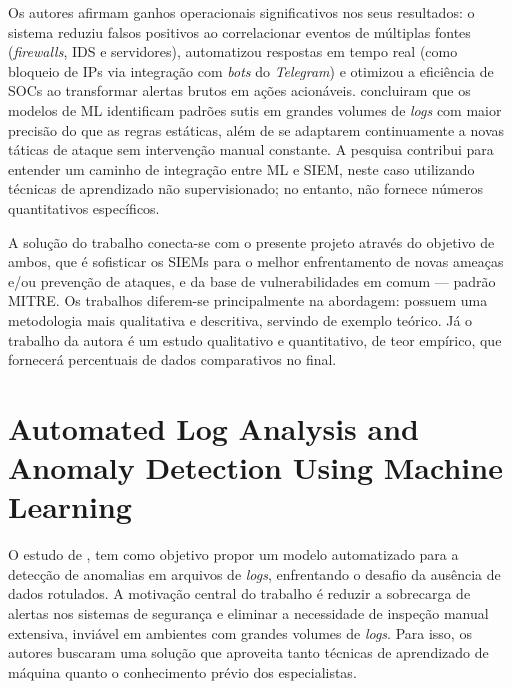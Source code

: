 Os autores afirmam ganhos operacionais significativos nos seus resultados: 
o sistema reduziu falsos positivos ao correlacionar eventos de múltiplas fontes (\textit{firewalls}, IDS e servidores), 
automatizou respostas em tempo real (como bloqueio de IPs via integração com \textit{bots} do \textit{Telegram}) e otimizou a eficiência de SOCs ao transformar alertas brutos em ações acionáveis. 
 concluiram que os modelos de ML identificam padrões sutis em grandes volumes de \textit{logs} com maior precisão do que as regras estáticas, além de se adaptarem continuamente a novas táticas de ataque sem intervenção manual constante.
A pesquisa contribui para entender um caminho de integração entre ML e SIEM, neste caso utilizando técnicas de aprendizado não supervisionado;
no entanto, não fornece números quantitativos específicos.

A solução do trabalho conecta-se com o presente projeto através do objetivo de ambos,
que é sofisticar os SIEMs para o melhor enfrentamento de novas ameaças e/ou prevenção de ataques,
e da base de vulnerabilidades em comum  --- padrão MITRE. 
Os trabalhos diferem-se principalmente na abordagem:  possuem uma metodologia mais qualitativa e descritiva, servindo de exemplo teórico. 
Já o trabalho da autora é um estudo qualitativo e quantitativo, de teor empírico, que fornecerá percentuais de dados comparativos no final.



\section{Automated Log Analysis and Anomaly Detection Using Machine Learning}

O estudo de , tem como objetivo propor um modelo automatizado para a detecção de anomalias em arquivos de \textit{logs}, enfrentando o desafio da ausência de dados rotulados. 
A motivação central do trabalho é reduzir a sobrecarga de alertas nos sistemas de segurança e eliminar a necessidade de inspeção manual extensiva, inviável em ambientes com grandes volumes de \textit{logs}. 
Para isso, os autores buscaram uma solução que aproveita tanto técnicas de aprendizado de máquina quanto o conhecimento prévio dos especialistas.

